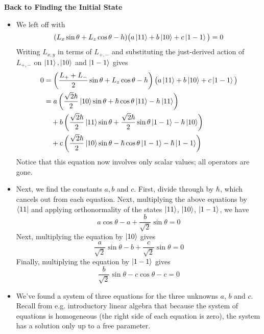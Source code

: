 \documentclass[11pt, a4paper]{article}
\begin{document}
\textbf{Back to Finding the Initial State}
\begin{itemize}
	\item We left off with
	\begin{equation*}
		(L_{x}\sin \theta + L_{z}\cos \theta - h)\big(a \ket{11} + b\ket{10} + c\ket{1-1}\big) = 0
	\end{equation*}
	Writing $ L_{x, y} $ in terms of $ L_{+,-} $ and substituting the just-derived action of $ L_{+,-} $ on $ \ket{11}, \ket{10} $ and $ \ket{1-1} $ gives
	\begin{align*}
		0 &= \left(\frac{L_{+}+L_{-}}{2}\sin \theta + L_{z}\cos \theta - h\right)\big(a \ket{11} + b\ket{10} + c\ket{1-1}\big)\\
		&=a\left(\frac{\sqrt{2}\hbar}{2}\ket{10}\sin \theta + \hbar \cos \theta \ket{11} - h\ket{11}\right) \\
		&{} \quad + b\left(\frac{\sqrt{2}\hbar}{2}\ket{11}\sin \theta + \frac{\sqrt{2}\hbar}{2}\sin \theta\ket{1-1} - \hbar\ket{10}\right)\\
		&{} \quad + c\left(\frac{\sqrt{2}\hbar}{2}\ket{10}\sin \theta -\hbar \cos \theta\ket{1-1} - \hbar\ket{1-1}\right)
	\end{align*}
	Notice that this equation now involves only scalar values; all operators are gone.
	
	\item Next, we find the constants $ a, b $ and $ c $. First, divide through by $ \hbar $, which cancels out from each equation. Next, multiplying the above equations by $ \bra{11} $ and applying orthonormality of the states $ \ket{11} $, $ \ket{10} $, $ \ket{1-1} $, we have
	\begin{equation*}
		a  \cos \theta - a  + \frac{b}{\sqrt{2}} \sin \theta = 0
	\end{equation*}
	Next, multiplying the equation by $ \ket{10} $ gives
	\begin{equation*}
		\frac{a}{\sqrt{2}}\sin \theta - b  + \frac{c}{\sqrt{2}}\sin \theta = 0
	\end{equation*}
	Finally, multiplying the equation by $ \ket{1-1} $ gives
	\begin{equation*}
		\frac{b}{\sqrt{2}} \sin \theta - c \cos \theta - c = 0
	\end{equation*}
	
	\item We've found a system of three equations for the three unknowns $ a $, $ b $ and $ c $. Recall from e.g. introductory linear algebra that because the system of equations is homogeneous (the right side of each equation is zero), the system has a solution only up to a free parameter. 
	

\end{itemize}
\end{document}
